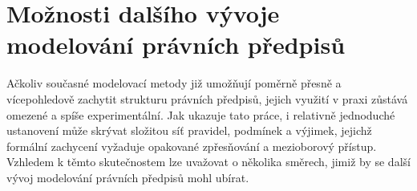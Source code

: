 
\section{Možnosti dalšího vývoje modelování právních předpisů}
\label{sec:moznosti-vyvoje}

Ačkoliv současné modelovací metody již umožňují poměrně přesně a vícepohledově zachytit strukturu právních předpisů, jejich využití v praxi zůstává omezené a spíše experimentální. Jak ukazuje tato práce, i relativně jednoduché ustanovení může skrývat složitou síť pravidel, podmínek a výjimek, jejichž formální zachycení vyžaduje opakované zpřesňování a mezioborový přístup. Vzhledem k těmto skutečnostem lze uvažovat o několika směrech, jimiž by se další vývoj modelování právních předpisů mohl ubírat.


